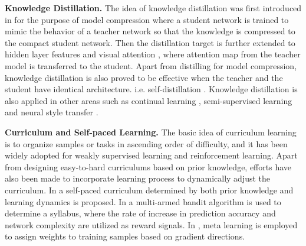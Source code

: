 \documentclass[runningheads]{llncs}
\begin{document}
	\noindent\textbf{Knowledge Distillation.} \quad 
The idea of knowledge distillation was first introduced in \cite{hinton2015distilling} for the purpose of model compression where a student network is trained to mimic the behavior of a teacher network so that the knowledge is compressed to the compact student network. Then the distillation target is further extended to hidden layer features \cite{romero2014fitnets} and visual attention \cite{zagoruyko2016paying}, where attention map from the teacher model is transferred to the student. Apart from distilling for model compression, knowledge distillation is also proved to be effective when the teacher and the student have identical architecture. i.e. self-distillation \cite{yim2017gift,furlanello2018born}. Knowledge distillation is also applied in other areas such as continual learning \cite{li2017learning,rebuffi2017icarl}, semi-supervised learning \cite{lopez2015unifying} and neural style transfer \cite{huang2017like}. 
	
	\noindent\textbf{Curriculum and Self-paced Learning.} \quad
The basic idea of curriculum learning is to organize samples or tasks in ascending order of difficulty, and it has been widely adopted for weakly supervised learning \cite{li2016weakly,jiang2017mentornet,guo2018curriculumnet} and reinforcement learning\cite{svetlik2017automatic,narvekar2017curriculum,narvekar2017autonomous}. Apart from designing easy-to-hard curriculums based on prior knowledge, efforts have also been made to incorporate learning process to dynamically adjust the curriculum. In \cite{jiang2015self} a self-paced curriculum determined by both prior knowledge and learning dynamics is proposed. In \cite{graves2017automated} a multi-armed bandit algorithm is used to determine a syllabus, where the rate of increase in prediction accuracy and network complexity are utilized as reward signals. In \cite{ren2018learning}, meta learning is employed to assign weights to training samples based on gradient directions. 


	
	
	
	
\end{document}
